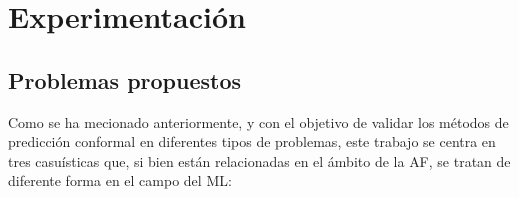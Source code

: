 \chapter{Experimentación}



\section{Problemas propuestos}

Como se ha mecionado anteriormente, y con el objetivo de validar los métodos de predicción conformal en diferentes tipos de problemas, este trabajo se centra en tres casuísticas que, si bien están relacionadas en el ámbito de la \acrshort{AF}, se tratan de diferente forma en el campo del \acrshort{ML}: 


